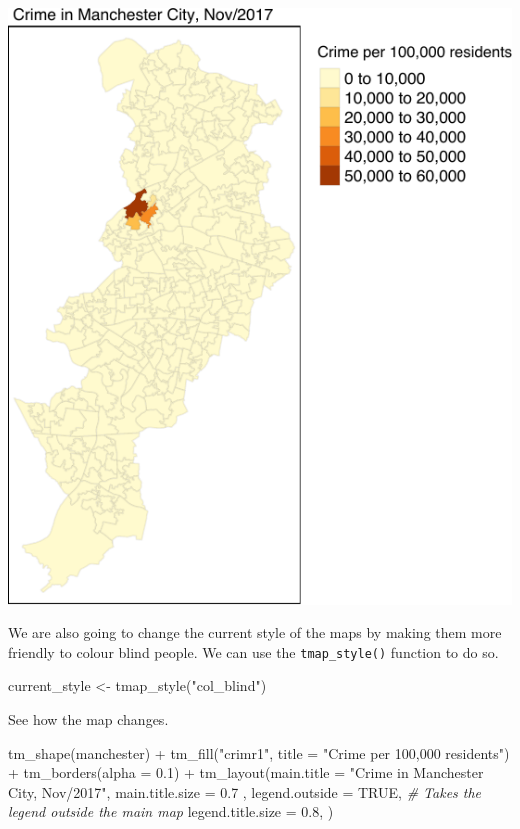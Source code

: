 \documentclass[
]{book}
\newenvironment{Shaded}{\begin{snugshade}}{\end{snugshade}}
\newcommand{\AttributeTok}[1]{\textcolor[rgb]{0.77,0.63,0.00}{#1}}
\newcommand{\CommentTok}[1]{\textcolor[rgb]{0.56,0.35,0.01}{\textit{#1}}}
\newcommand{\ConstantTok}[1]{\textcolor[rgb]{0.00,0.00,0.00}{#1}}
\newcommand{\FloatTok}[1]{\textcolor[rgb]{0.00,0.00,0.81}{#1}}
\newcommand{\FunctionTok}[1]{\textcolor[rgb]{0.00,0.00,0.00}{#1}}
\newcommand{\NormalTok}[1]{#1}
\newcommand{\OtherTok}[1]{\textcolor[rgb]{0.56,0.35,0.01}{#1}}
\newcommand{\SpecialCharTok}[1]{\textcolor[rgb]{0.00,0.00,0.00}{#1}}
\newcommand{\StringTok}[1]{\textcolor[rgb]{0.31,0.60,0.02}{#1}}
\begin{document}
\includegraphics{crime_mapping_files/figure-latex/unnamed-chunk-87-1.pdf}

We are also going to change the current style of the maps by making them more friendly to colour blind people. We can use the \texttt{tmap\_style()} function to do so.

\begin{Shaded}
\begin{Highlighting}[]
\NormalTok{current\_style }\OtherTok{\textless{}{-}} \FunctionTok{tmap\_style}\NormalTok{(}\StringTok{"col\_blind"}\NormalTok{)}
\end{Highlighting}
\end{Shaded}

See how the map changes.

\begin{Shaded}
\begin{Highlighting}[]
\FunctionTok{tm\_shape}\NormalTok{(manchester) }\SpecialCharTok{+} 
  \FunctionTok{tm\_fill}\NormalTok{(}\StringTok{"crimr1"}\NormalTok{, }\AttributeTok{title =} \StringTok{"Crime per 100,000 residents"}\NormalTok{) }\SpecialCharTok{+}
  \FunctionTok{tm\_borders}\NormalTok{(}\AttributeTok{alpha =} \FloatTok{0.1}\NormalTok{) }\SpecialCharTok{+}
  \FunctionTok{tm\_layout}\NormalTok{(}\AttributeTok{main.title =} \StringTok{"Crime in Manchester City, Nov/2017"}\NormalTok{, }
            \AttributeTok{main.title.size =} \FloatTok{0.7}\NormalTok{ ,}
            \AttributeTok{legend.outside =} \ConstantTok{TRUE}\NormalTok{,  }\CommentTok{\# Takes the legend outside the main map }
            \AttributeTok{legend.title.size =} \FloatTok{0.8}\NormalTok{,}
\NormalTok{            )}
\end{Highlighting}
\end{Shaded}
\end{document}
